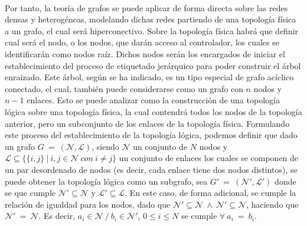 \\
Por tanto, la teoría de grafos se puede aplicar de forma directa sobre las redes densas y heterogéneas, modelando dichas redes partiendo de una topología física a un grafo, el cual será hiperconectivo. Sobre la topología física habrá que definir cual será el nodo, o los nodos, que darán acceso al controlador, los cuales se identificarán como nodos raíz. Dichos nodos serán los encargados de iniciar el establecimiento del proceso de etiquetado jerárquico para poder construir el árbol enraizado. Este árbol, según se ha indicado, es un tipo especial de grafo acíclico conectado, el cual, también puede considerarse como un grafo con $n$ nodos y $n-1$ enlaces. Esto se puede analizar como la construcción de una topología lógica sobre una topología física, la cual contendrá todos los nodos de la topología anterior, pero un subconjunto de los enlaces de la topología física. Formulando este proceso del establecimiento de la topología lógica, podemos definir que dado un grafo $G \: = \: (\mathcal{N}, \mathcal{L})$, siendo  $\mathcal{N}$ un conjunto de $N$ nodos y $\mathcal{L} \subseteq \{\{i,j\} \: | \: i,j \in \mathcal{N} \: con \: i \neq j\}$ un conjunto de enlaces los cuales se componen de un par desordenado de nodos (es decir, cada enlace tiene dos nodos distintos), se puede obtener la topología lógica como un subgrafo, sea $G' \: = \: (\mathcal{N}', \mathcal{L}')$ donde se que cumple $\mathcal{N}' \subseteq \mathcal{N}$ y $\mathcal{L}' \subseteq \mathcal{L}$. En este caso, de forma adicional, se cumple la relación de igualdad para los nodos, dado que $\mathcal{N}' \subseteq \mathcal{N} \: \wedge \: \mathcal{N}' \subseteq \mathcal{N} $, haciendo que $\mathcal{N}' \: = \: \mathcal{N}$. Es decir, $a_{i} \in \mathcal{N} \: / \: b_{i} \in \mathcal{N}'$, $0 \leq i \leq N$ se cumple $\forall \: a_{i} \: = \: b_{i}$.\\
\\
